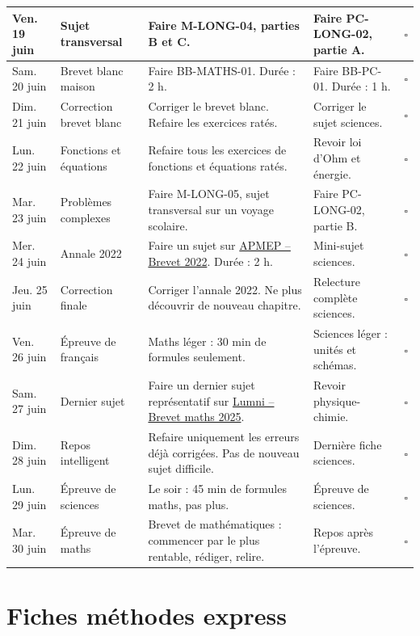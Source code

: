 \documentclass[11pt,a4paper]{article}
\newcounter{exercice}
\begin{document}
\begin{longtable}{|p{2.3cm}|p{3.2cm}|p{4.7cm}|p{4.7cm}|p{0.7cm}|}
\hline
Ven. 19 juin & Sujet transversal & Faire M-LONG-04, parties B et C. & Faire PC-LONG-02, partie A. & $\square$ \\
\hline
Sam. 20 juin & Brevet blanc maison & Faire BB-MATHS-01. Durée : 2 h. & Faire BB-PC-01. Durée : 1 h. & $\square$ \\
\hline
Dim. 21 juin & Correction brevet blanc & Corriger le brevet blanc. Refaire les exercices ratés. & Corriger le sujet sciences. & $\square$ \\
\hline
Lun. 22 juin & Fonctions et équations & Refaire tous les exercices de fonctions et équations ratés. & Revoir loi d'Ohm et énergie. & $\square$ \\
\hline
Mar. 23 juin & Problèmes complexes & Faire M-LONG-05, sujet transversal sur un voyage scolaire. & Faire PC-LONG-02, partie B. & $\square$ \\
\hline
Mer. 24 juin & Annale 2022 & Faire un sujet sur \href{https://www.apmep.fr/Brevet-2022}{APMEP -- Brevet 2022}. Durée : 2 h. & Mini-sujet sciences. & $\square$ \\
\hline
Jeu. 25 juin & Correction finale & Corriger l'annale 2022. Ne plus découvrir de nouveau chapitre. & Relecture complète sciences. & $\square$ \\
\hline
Ven. 26 juin & Épreuve de français & Maths léger : 30 min de formules seulement. & Sciences léger : unités et schémas. & $\square$ \\
\hline
Sam. 27 juin & Dernier sujet & Faire un dernier sujet représentatif sur \href{https://www.lumni.fr/article/maths-sujets-et-corriges-serie-generale-brevet-2025}{Lumni -- Brevet maths 2025}. & Revoir physique-chimie. & $\square$ \\
\hline
Dim. 28 juin & Repos intelligent & Refaire uniquement les erreurs déjà corrigées. Pas de nouveau sujet difficile. & Dernière fiche sciences. & $\square$ \\
\hline
Lun. 29 juin & Épreuve de sciences & Le soir : 45 min de formules maths, pas plus. & Épreuve de sciences. & $\square$ \\
\hline
Mar. 30 juin & Épreuve de maths & Brevet de mathématiques : commencer par le plus rentable, rédiger, relire. & Repos après l'épreuve. & $\square$ \\
\hline
\end{longtable}
\newpage
\section{Fiches méthodes express}
\end{document}
